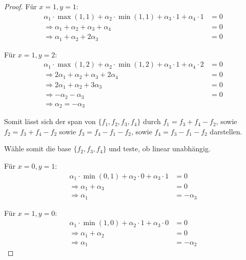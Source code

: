 \documentclass{../problemset}
\begin{document}
\begin{problem}
\begin{proof}
    Für $x = 1, y = 1$:
    \begin{align*}
        \alpha_1 \cdot \max(1, 1) + \alpha_2 \cdot \min(1, 1) + \alpha_3 \cdot 1 + \alpha_4 \cdot 1 & = 0 \\
        \Rightarrow \alpha_1 + \alpha_2 + \alpha_3 + \alpha_4                                       & = 0 \\
        \Rightarrow \alpha_1 + \alpha_2 + 2 \alpha_3                                                & = 0
    \end{align*}

    Für $x = 1, y = 2$:
    \begin{align*}
        \alpha_1 \cdot \max(1, 2) + \alpha_2 \cdot \min(1, 2) + \alpha_3 \cdot 1 + \alpha_4 \cdot 2 & = 0 \\
        \Rightarrow 2\alpha_1 + \alpha_2 + \alpha_3 + 2\alpha_4                                     & = 0 \\
        \Rightarrow 2\alpha_1 + \alpha_2 + 3 \alpha_3                                               & = 0 \\
        \Rightarrow -\alpha_2 - \alpha_3                                                            & = 0 \\
        \Rightarrow \alpha_2 = - \alpha_3
    \end{align*}

    Somit lässt sich der span von $\{f_1, f_2, f_3, f_4\}$ durch $f_1 = f_3 + f_4 - f_2$, sowie $f_2 = f_3 + f_4 - f_2$ sowie $f_3 = f_4 - f_1 - f_2$, sowie $f_4 = f_3 - f_1 - f_2$ darstellen.

    Wähle somit die base $\{f_2, f_3, f_4\}$ und teste, ob linear unabhängig.

    Für $x = 0, y = 1$:
    \begin{align*}
        \alpha_1 \cdot \min(0, 1) + \alpha_2 \cdot 0 + \alpha_3 \cdot 1 & = 0         \\
        \Rightarrow \alpha_1 + \alpha_3                                 & = 0         \\
        \Rightarrow \alpha_1                                            & = -\alpha_3
    \end{align*}

    Für $x = 1, y = 0$:
    \begin{align*}
        \alpha_1 \cdot \min(1, 0) + \alpha_2 \cdot 1 + \alpha_3 \cdot 0 & = 0         \\
        \Rightarrow \alpha_1 + \alpha_2                                 & = 0         \\
        \Rightarrow \alpha_1                                            & = -\alpha_2
    \end{align*}


\end{proof}
\end{problem}
\end{document}
